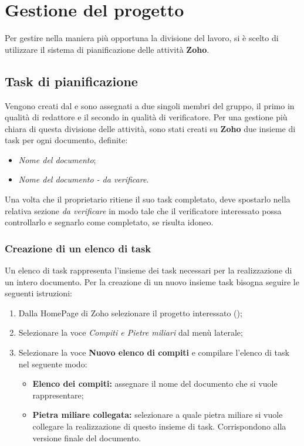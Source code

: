 \section{Gestione del progetto}
Per gestire nella maniera più opportuna la divisione del lavoro, si è scelto di 
utilizzare il sistema di pianificazione delle attività \textbf{Zoho}.

\subsection{Task di pianificazione}
Vengono creati dal \textsl{\RdP} e sono assegnati a due singoli membri del gruppo, 
il primo in qualità di redattore e il secondo in qualità di verificatore.
Per una gestione più chiara di questa divisione delle attività, sono stati creati su \textbf{Zoho} 
due insieme di task per ogni documento, definite:
\begin{itemize}
  \item \textsl{Nome del documento};
  \item \textsl{Nome del documento - da verificare}.
\end{itemize}
Una volta che il proprietario ritiene il suo task completato, deve spostarlo 
nella relativa sezione \textsl{da verificare} in modo tale che il verificatore 
interessato possa controllarlo e segnarlo come completato, se risulta idoneo. 

\subsubsection{Creazione di un elenco di task}
Un elenco di task rappresenta l'insieme dei task necessari per la realizzazione di un intero documento.
Per la creazione di un nuovo insieme task bisogna seguire le seguenti istruzioni:
\begin{enumerate}
   \item Dalla HomePage di Zoho selezionare il progetto interessato (\progetto);
  \item Selezionare la voce \textsl{Compiti e Pietre miliari} dal menù laterale;
   \item Selezionare la voce \textbf{Nuovo elenco di compiti} e compilare l'elenco di task nel 
  seguente modo:
  \begin{itemize}
    \item \textbf{Elenco dei compiti:} assegnare il nome del documento che si 
    vuole rappresentare;
    \item \textbf{Pietra miliare collegata:} selezionare a quale pietra miliare si 
    vuole collegare la realizzazione di questo insieme di task. Corrispondono alla 
    versione finale del documento.
  \end{itemize}
\end{enumerate}
